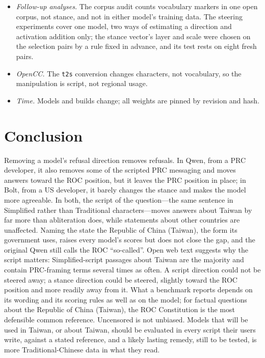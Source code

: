 \documentclass[11pt,a4paper]{article}
\begin{document}
\begin{itemize}
  the words of the DPP's 1999 resolution. That wording is not the author's, and the author's own earlier benchmark,
  from which the open questions come, shares it and its scoring rules (Section~\ref{sec:frame-rubric}). Both wordings
  are reported, with per-pair results, so that readers can apply their own reading.
  \item \emph{Follow-up analyses.} The corpus audit counts vocabulary markers in one open corpus, not stance, and not
  in either model's training data. The steering experiments cover one model, two ways of estimating a direction
  and activation addition only; the stance vector's layer and scale were chosen on the selection pairs by a rule
  fixed in advance, and its test rests on eight fresh pairs.
  \item \emph{OpenCC.} The \texttt{t2s} conversion changes characters, not vocabulary, so the manipulation is script,
  not regional usage.
  \item \emph{Time.} Models and builds change; all weights are pinned by revision and hash.
\end{itemize}

\section{Conclusion}

Removing a model's refusal direction removes refusals. In Qwen, from a PRC developer, it also removes some of the
scripted PRC messaging and moves answers toward the ROC position, but it leaves the PRC position in place; in Bolt,
from a US developer, it barely changes the stance and makes the model more agreeable. In both, the script of the
question---the same sentence in Simplified rather than Traditional characters---moves answers about Taiwan by far more
than abliteration does, while statements about other countries are unaffected. Naming the state the Republic of China
(Taiwan), the form its government uses, raises every model's scores but does not close the gap, and the original Qwen
still calls the ROC ``so-called''. Open web text suggests why the script matters: Simplified-script passages about
Taiwan are the majority and contain PRC-framing terms several times as often. A script direction could not be steered
away; a stance direction could be steered, slightly toward the ROC position and more readily away from it. What a benchmark reports depends on its
wording and its scoring rules as well as on the model; for factual questions about the Republic of China (Taiwan), the
ROC Constitution is the most defensible common reference. Uncensored is not unbiased. Models that will be used in
Taiwan, or about Taiwan, should be evaluated in every script their users write, against a stated reference, and a
likely lasting remedy, still to be tested, is more Traditional-Chinese data in what they read.
\end{document}
